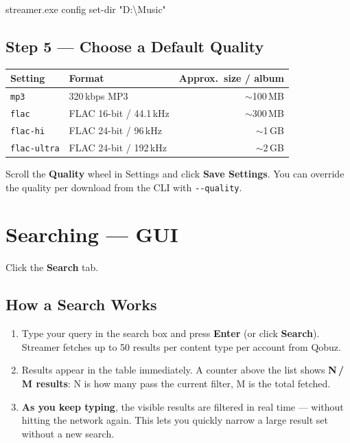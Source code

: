 \documentclass[11pt,a4paper]{article}
\begin{document}
\begin{cmdbox}
streamer.exe config set-dir "D:\textbackslash{}Music"
\end{cmdbox}

\subsection{Step 5 --- Choose a Default Quality}

\begin{center}
\begin{tabular}{@{}llr@{}}
\toprule
\textbf{Setting}  & \textbf{Format}            & \textbf{Approx.\ size / album} \\
\midrule
\texttt{mp3}        & 320\,kbps MP3              & $\sim$100\,MB \\
\texttt{flac}       & FLAC 16-bit / 44.1\,kHz   & $\sim$300\,MB \\
\texttt{flac-hi}    & FLAC 24-bit / 96\,kHz      & $\sim$1\,GB   \\
\texttt{flac-ultra} & FLAC 24-bit / 192\,kHz     & $\sim$2\,GB   \\
\bottomrule
\end{tabular}
\end{center}

Scroll the \textbf{Quality} wheel in Settings and click \textbf{Save
Settings}.  You can override the quality per download from the CLI with
\texttt{-{}-quality}.

\section{Searching --- GUI}

Click the \textbf{Search} tab.

\subsection{How a Search Works}

\begin{enumerate}
  \item Type your query in the search box and press \textbf{Enter} (or click
        \textbf{Search}).  Streamer fetches up to 50 results per content type
        per account from Qobuz.
  \item Results appear in the table immediately.  A counter above the list
        shows \textbf{N\,/\,M results}: N is how many pass the current filter,
        M is the total fetched.
  \item \textbf{As you keep typing}, the visible results are filtered
        in real time --- without hitting the network again.  This lets you
        quickly narrow a large result set without a new search.
\end{enumerate}
\end{document}

